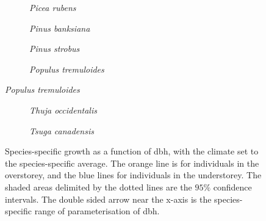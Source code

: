 \documentclass[letterpaper, 12pt]{article}
\theoremstyle{theo}
\begin{document}
\begin{refsection}
\begin{onehalfspace}
\begin{figure}[htb] \ContinuedFloat %
	\centering
	\begin{subfigure}{0.48\textwidth}
		
		\caption{\textit{Picea rubens}}
		\label{fig::picrub_G_dbh}
	\end{subfigure}
	\hfil
	\begin{subfigure}{0.48\textwidth}
		
		\caption{\textit{Pinus banksiana}}
		\label{fig::pinban_G_dbh}
	\end{subfigure}
	\medskip
	\begin{subfigure}{0.48\textwidth}
		
		\caption{\textit{Pinus strobus}}
		\label{fig::pinstr_G_dbh}
	\end{subfigure}
	\hfil
	\begin{subfigure}{0.48\textwidth}
		
		\caption{\textit{Populus tremuloides}}
		\label{fig::poptre_G_dbh}
	\end{subfigure}
\end{figure}

\begin{figure}[htb] \ContinuedFloat %
	\centering
	\begin{subfigure}{0.48\textwidth}
		
		\caption{\textit{Thuja occidentalis}}
		\label{fig::thuocc_G_dbh}
	\end{subfigure}
	\hfil
	\begin{subfigure}{0.48\textwidth}
		
		\caption{\textit{Tsuga canadensis}}
		\label{fig::tsucan_G_dbh}
	\end{subfigure}
	\caption[Species-specific growth in function of dbh]{Species-specific growth as a function of dbh, with the climate set to the species-specific average. The orange line is for individuals in the overstorey, and the blue lines for individuals in the understorey. The shaded areas delimited by the dotted lines are the $ 95 \% $ confidence intervals. The double sided arrow near the x-axis is the species-specific range of parameterisation of dbh.}
	\label{fig::12speciesG_dbh}
\end{figure}


\end{onehalfspace}
\end{refsection}
\end{document}
